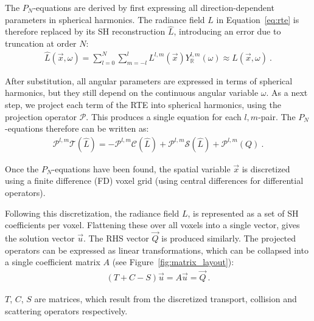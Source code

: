 \documentclass{egpubl}
\newcommand{\SHBR}{Y_{\mathbb{R}}} %
\begin{document}
The $P_N$-equations are derived by first expressing all direction-dependent parameters in spherical harmonics. The radiance field $L$ in Equation~\ref{eq:rte} is therefore replaced by its SH reconstruction $\widehat{L}$, introducing an error due to truncation at order $N$:
\begin{align}
\widehat{L}\left(\vec{x}, \omega\right) =
\sum_{l=0}^{N}
{
\sum_{m=-l}^{l}
{
L^{l,m}\left(\vec{x}\right)\SHBR^{l,m}\left(\omega\right)
}
}
\approx
L\left(\vec{x}, \omega\right)
\ .
\nonumber
\end{align}

After substitution, all angular parameters are expressed in terms of spherical harmonics, but they still depend on the continuous angular variable $\omega$. As a next step, we project each term of the RTE into spherical harmonics, using the projection operator $\mathcal{P}$. This produces a single equation for each $l,m$-pair. The $P_N$-equations therefore can be written as:
\begin{align}
\mathcal{P}^{l,m}\mathcal{T}\left(\widehat{L}\right)
=
-\mathcal{P}^{l,m}\mathcal{C}\left(\widehat{L}\right)
+\mathcal{P}^{l,m}\mathcal{S}\left(\widehat{L}\right)
+\mathcal{P}^{l,m}\left(Q\right)
\ .
\label{eq:pn_operator_notation}
\end{align}

Once the $P_N$-equations have been found, the spatial variable $\vec{x}$ is discretized using a finite difference (FD) voxel grid (using central differences for differential operators).

Following this discretization, the radiance field $L$, is represented as a set of SH coefficients per voxel. Flattening these over all voxels into a single vector, gives the solution vector $\vec{u}$. The RHS vector $\vec{Q}$ is produced similarly. The projected operators can be expressed as linear transformations, which can be collapsed into a single coefficient matrix $A$ (see Figure~\ref{fig:matrix_layout}):
\begin{align}
(T+C-S)\vec{u} = A\vec{u} = \vec{Q}
\ .
\end{align}

$T$, $C$, $S$ are matrices, which result from the discretized transport, collision and scattering operators respectively.
\end{document}

